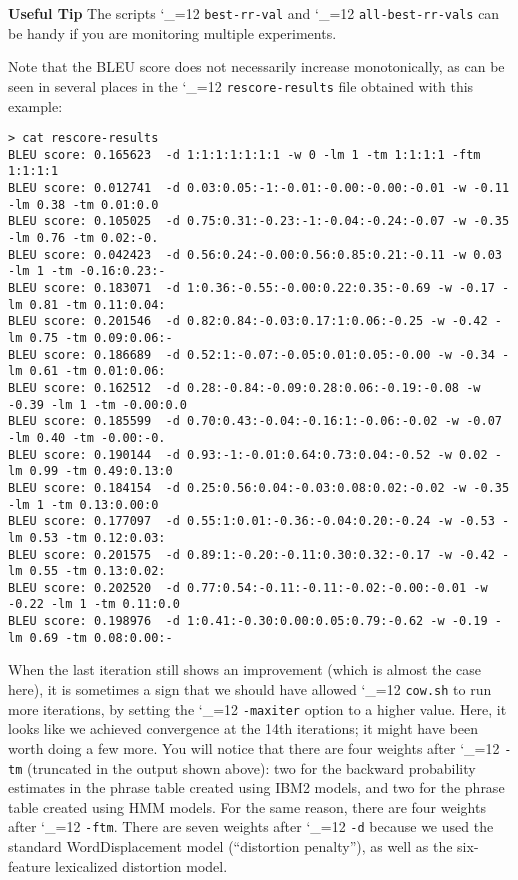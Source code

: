 \documentclass[11pt,letterpaper]{article}
\def\code{\begingroup\catcode`\_=12 \codex}
\newcommand{\codex}[1]{\texttt{#1}\endgroup}
\newcommand{\tip}{\textbf{Useful Tip \large{\ding{43}} }}
\newcommand{\margintip}{\marginpar[{\textbf{Tip \large{\ding{43}}}}]{\textbf{\reflectbox{\large{\ding{43}}} Tip}}}
\newcommand{\tipend}{\textbf{ \reflectbox{\large{\ding{43}}}}}
\begin{document}
\tip \margintip The scripts \code{best-rr-val} and \code{all-best-rr-vals} can
be handy if you are monitoring multiple experiments. \tipend

Note that the BLEU score does not necessarily increase
monotonically, as can be seen in several places in the \code{rescore-results}
file obtained with this example:
\begin{footnotesize}
\begin{verbatim}
> cat rescore-results
BLEU score: 0.165623  -d 1:1:1:1:1:1:1 -w 0 -lm 1 -tm 1:1:1:1 -ftm 1:1:1:1
BLEU score: 0.012741  -d 0.03:0.05:-1:-0.01:-0.00:-0.00:-0.01 -w -0.11 -lm 0.38 -tm 0.01:0.0
BLEU score: 0.105025  -d 0.75:0.31:-0.23:-1:-0.04:-0.24:-0.07 -w -0.35 -lm 0.76 -tm 0.02:-0.
BLEU score: 0.042423  -d 0.56:0.24:-0.00:0.56:0.85:0.21:-0.11 -w 0.03 -lm 1 -tm -0.16:0.23:-
BLEU score: 0.183071  -d 1:0.36:-0.55:-0.00:0.22:0.35:-0.69 -w -0.17 -lm 0.81 -tm 0.11:0.04:
BLEU score: 0.201546  -d 0.82:0.84:-0.03:0.17:1:0.06:-0.25 -w -0.42 -lm 0.75 -tm 0.09:0.06:-
BLEU score: 0.186689  -d 0.52:1:-0.07:-0.05:0.01:0.05:-0.00 -w -0.34 -lm 0.61 -tm 0.01:0.06:
BLEU score: 0.162512  -d 0.28:-0.84:-0.09:0.28:0.06:-0.19:-0.08 -w -0.39 -lm 1 -tm -0.00:0.0
BLEU score: 0.185599  -d 0.70:0.43:-0.04:-0.16:1:-0.06:-0.02 -w -0.07 -lm 0.40 -tm -0.00:-0.
BLEU score: 0.190144  -d 0.93:-1:-0.01:0.64:0.73:0.04:-0.52 -w 0.02 -lm 0.99 -tm 0.49:0.13:0
BLEU score: 0.184154  -d 0.25:0.56:0.04:-0.03:0.08:0.02:-0.02 -w -0.35 -lm 1 -tm 0.13:0.00:0
BLEU score: 0.177097  -d 0.55:1:0.01:-0.36:-0.04:0.20:-0.24 -w -0.53 -lm 0.53 -tm 0.12:0.03:
BLEU score: 0.201575  -d 0.89:1:-0.20:-0.11:0.30:0.32:-0.17 -w -0.42 -lm 0.55 -tm 0.13:0.02:
BLEU score: 0.202520  -d 0.77:0.54:-0.11:-0.11:-0.02:-0.00:-0.01 -w -0.22 -lm 1 -tm 0.11:0.0
BLEU score: 0.198976  -d 1:0.41:-0.30:0.00:0.05:0.79:-0.62 -w -0.19 -lm 0.69 -tm 0.08:0.00:-
\end{verbatim}
\end{footnotesize}
When the last iteration still shows an improvement (which is almost the case
here), it is sometimes a sign that we should have allowed \code{cow.sh} to
run more iterations, by setting the \code{-maxiter} option to a higher value.
Here, it looks like we achieved convergence at the 14th iterations; it might
have been worth doing a few more.  You will notice that there are four weights
after \code{-tm} (truncated in the output shown above): two for the backward
probability estimates in the phrase table created using IBM2 models, and two
for the phrase table created using HMM models.  For the same reason, there are
four weights after \code{-ftm}.  There are seven weights after \code{-d}
because we used the standard WordDisplacement model (``distortion penalty''),
as well as the six-feature lexicalized distortion model.
\end{document}
